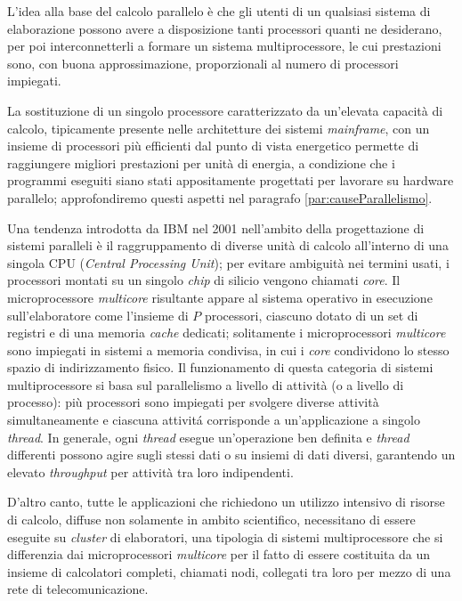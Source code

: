 L'idea alla base del calcolo parallelo \`e che gli utenti di un qualsiasi sistema di elaborazione possono avere a disposizione tanti processori
quanti ne desiderano, per poi interconnetterli a formare un sistema
multiprocessore, le cui prestazioni sono, con buona approssimazione,
proporzionali al numero di processori impiegati.

La sostituzione di un singolo processore caratterizzato da un'elevata
capacit\`a di calcolo, tipicamente presente nelle architetture dei sistemi
\textit{mainframe}, con un insieme di processori pi\`u efficienti
dal punto di vista energetico permette di raggiungere migliori prestazioni
per unit\`a di energia, a condizione che i programmi eseguiti siano stati
appositamente progettati per lavorare su hardware parallelo; approfondiremo questi aspetti nel paragrafo \ref{par:causeParallelismo}.

Una tendenza introdotta da IBM nel 2001 nell'ambito della progettazione di sistemi paralleli \`e il raggruppamento
di diverse unit\`a di calcolo all'interno di una singola CPU (\textit{Central Processing Unit}); per evitare ambiguit\`a nei termini usati, i processori montati su un singolo \textit{chip} di silicio vengono chiamati \textit{core}.\newline
Il microprocessore \textit{multicore} risultante appare al sistema operativo in esecuzione sull'elaboratore come l'insieme di $P$ processori, ciascuno dotato di un set di registri e di una memoria \textit{cache} dedicati; solitamente i microprocessori \textit{multicore} sono impiegati in sistemi a memoria condivisa, in cui i \textit{core} condividono lo stesso spazio di indirizzamento fisico.\newline
Il funzionamento di questa categoria di sistemi multiprocessore si basa sul parallelismo a livello di attivit\`a (o a livello di processo): pi\`u
processori sono impiegati per svolgere diverse attivit\`a simultaneamente e ciascuna attivit\'a corrisponde a un'applicazione a singolo
\textit{thread}. In generale, ogni \textit{thread} esegue un'operazione ben definita e \textit{thread} differenti possono agire sugli stessi
dati o su insiemi di dati diversi, garantendo un elevato \textit{throughput} per attivit\`a tra loro indipendenti.

D'altro canto, tutte le applicazioni che richiedono un utilizzo intensivo di risorse di calcolo, diffuse non solamente in ambito
scientifico, necessitano di essere eseguite su \textit{cluster} di elaboratori, una tipologia di sistemi multiprocessore che si differenzia dai microprocessori \textit{multicore} per il fatto di essere costituita da un insieme di calcolatori completi, chiamati nodi, collegati tra loro per mezzo di una rete di telecomunicazione.

